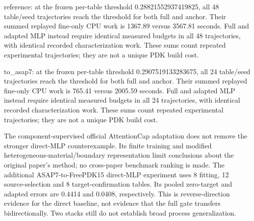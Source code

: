 \documentclass[10pt,twocolumn]{article}
\begin{document}
reference: at the frozen per-table threshold 0.28821552937419825, all 48 table/seed trajectories reach the threshold for both full and anchor. Their summed replayed fine-only CPU work is 1367.89 versus 3567.81 seconds. Full and adapted MLP instead require identical measured budgets in all 48 trajectories, with identical recorded characterization work. These sums count repeated experimental trajectories; they are not a unique PDK build cost.

to\_asap7: at the frozen per-table threshold 0.2907519133283675, all 24 table/seed trajectories reach the threshold for both full and anchor. Their summed replayed fine-only CPU work is 765.41 versus 2005.59 seconds. Full and adapted MLP instead require identical measured budgets in all 24 trajectories, with identical recorded characterization work. These sums count repeated experimental trajectories; they are not a unique PDK build cost.

\begin{table}[t]\centering\scriptsize{}\caption{Component-supervised adaptation of official AttentionCap, not its original benchmark.}\end{table}


The component-supervised official AttentionCap adaptation does not remove the stronger direct-MLP counterexample. Its finite training and modified heterogeneous-material/boundary representation limit conclusions about the original paper's method; no cross-paper benchmark ranking is made. The additional ASAP7-to-FreePDK15 direct-MLP experiment uses 8 fitting, 12 source-selection and 8 target-confirmation tables. Its pooled zero-target and adapted errors are 0.4414 and 0.0408, respectively. This is reverse-direction evidence for the direct baseline, not evidence that the full gate transfers bidirectionally. Two stacks still do not establish broad process generalization.
\end{document}
